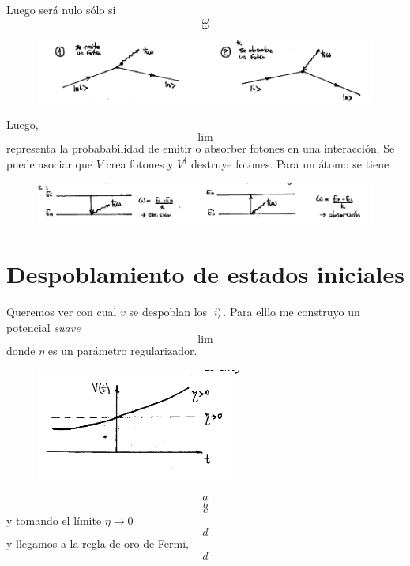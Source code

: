 \documentclass[10pt,oneside]{CBFT_book}
\begin{document}
Luego será nulo sólo si 
\[
	\omega
\]
\[
	\omega
\]

\begin{figure}[htb]
	\begin{center}
	\includegraphics[width=1.0\textwidth]{images/teo2_25.pdf}
	\end{center}
	\caption{}
\end{figure} 

Luego,
\[
	\lim 
\]
representa la probababilidad de emitir o absorber fotones en una interacción. Se puede asociar que $V$ crea 
fotones y $V^\dagger$ destruye fotones. Para un átomo se tiene 
\begin{figure}[htb]
	\begin{center}
	\includegraphics[width=1.0\textwidth]{images/teo2_26.pdf}
	\end{center}
	\caption{}
\end{figure} 




\section{Despoblamiento de estados iniciales}

Queremos ver con cual $v$ se despoblan los $\Ket{i}$. Para elllo me construyo un potencial {\it suave}
\[
	\lim 
\]
donde $\eta$ es un parámetro regularizador.
\begin{figure}[htb]
	\begin{center}
	\includegraphics[width=0.6\textwidth]{images/teo2_27.pdf}
	\end{center}
	\caption{}
\end{figure} 
\[
	a
\]
\[
	b
\]
\[
 	c
\]
y tomando el límite $\eta \to 0$ 
\[
	d
\]
y llegamos a la regla de oro de Fermi,
\[
	d
\]
\end{document}
